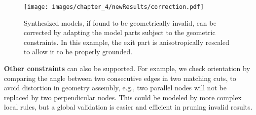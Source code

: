\begin{figure}[h!]
	\centering
		\texttt{[image: images/chapter\_4/newResults/correction.pdf]}
		\caption{Synthesized models, if found to be geometrically invalid, can be corrected by adapting the model parts
		subject to the geometric constraints. In this example, the exit part is anisotropically rescaled to allow it to be properly grounded. }
\label{fig:geometric_constraints}
\end{figure}


\noindent \textbf{Other constraints} can also be supported. For example, we check orientation by comparing the angle between two consecutive edges in two matching cuts, to avoid distortion in geometry assembly, e.g., two parallel nodes will not be replaced by two perpendicular nodes. This could be modeled by more complex local rules, but a global validation is easier and efficient in pruning invalid results.

